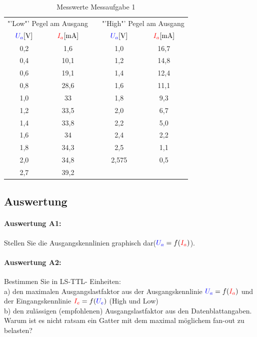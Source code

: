 \documentclass[11pt,a4paper,titlepage]{scrreprt}
\begin{document}
          \begin{center}
            \begin{table}[!hbtp]
              \caption{Messwerte Messaufgabe 1}
              \renewcommand{\arraystretch}{1.3}
              \begin{center}
                \begin{tabular}{cc|c|cc}
                  \multicolumn{2}{c|}{"'Low"' Pegel am Ausgang} &&\multicolumn{2}{c}{"'High"' Pegel am Ausgang}\\
                  $\textcolor{blue}{U_a} [\si{\volt}]$ & $\textcolor{red}{I_a} [\si{\milli\ampere}] $&& $\textcolor{blue}{U_a} [\si{\volt}]$ & $\textcolor{red}{I_a} [\si{\milli\ampere}] $\\ \hline
                  0,2 & 1,6 &  & 1,0 & 16,7\\
                  0,4 & 10,1 &  & 1,2 & 14,8\\
                  0,6 & 19,1 &  & 1,4 & 12,4\\
                  0,8 & 28,6 &  & 1,6 & 11,1\\
                  1,0 & 33 &  & 1,8 & 9,3\\
                  1,2 & 33,5 &  & 2,0 & 6,7\\
                  1,4 & 33,8 &  & 2,2 & 5,0\\
                  1,6 & 34 &  & 2,4 & 2,2\\
                  1,8 & 34,3 &  & 2,5 & 1,1\\
                  2,0 & 34,8 &  &  2,575 & 0,5\\
                  2,7 & 39,2 &  & &
                \end{tabular}
              \end{center}
            \end{table}
          \end{center}


      \subsection{Auswertung}
        \paragraph{Auswertung A1:} Stellen Sie die Ausgangskennlinien graphisch dar($\textcolor{blue}{U_a} = f(\textcolor{red}{I_a})$).


        \paragraph{Auswertung A2:} Bestimmen Sie in LS-TTL- Einheiten:\\
          a) den maximalen Ausgangslastfaktor aus der Ausgangskennlinie $\textcolor{blue}{U_a} = f(\textcolor{red}{I_a})$ und der Eingangskennlinie $\textcolor{red}{I_e} = f(\textcolor{blue}{U_e})$ (High und Low)\\
          b) den zulässigen (empfohlenen) Ausgangslastfaktor aus den Datenblattangaben.
          Warum ist es nicht ratsam ein Gatter mit dem maximal möglichem fan-out zu belasten?
\end{document}
